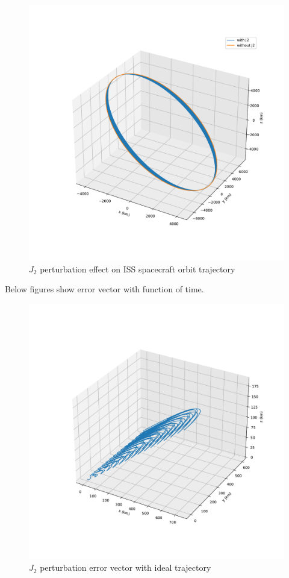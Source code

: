 \begin{figure}[H]
    \centering
    \includegraphics[width=1\textwidth]{../Figure/Q3/ISS_trajectory}
    \caption{$J_2$ perturbation effect on ISS spacecraft orbit trajectory}
\end{figure}
Below figures show error vector with function of time.

\begin{figure}[H]
    \centering
    \includegraphics[width=1\textwidth]{../Figure/Q3/ISS_trajectory_error_3D}
    \caption{$J_2$ perturbation error vector with ideal trajectory}
\end{figure}

